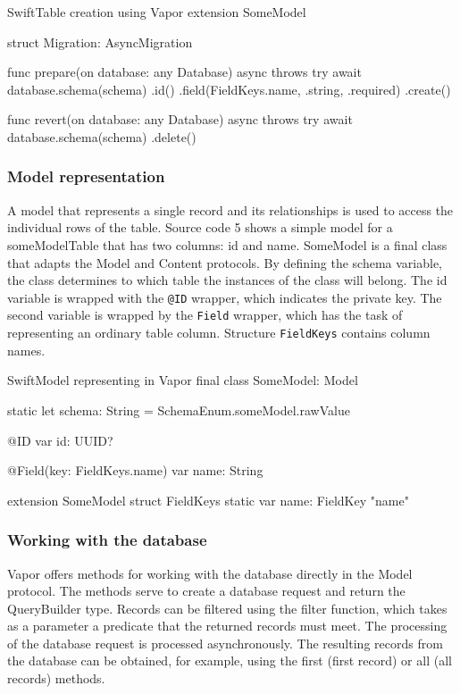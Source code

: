 \documentclass[
  biblatex = false,
  language=english,
  figures=false,
  sourcecodes,
  glossaries,
  index
]{kidiplom}
\begin{document}
\begin{kicode}{Swift}{}{Table creation using Vapor}
extension SomeModel {
    struct Migration: AsyncMigration {
        
        func prepare(on database: any Database) async throws {
            try await database.schema(schema)
                .id()
                .field(FieldKeys.name, .string, .required)
                .create()
        }
        
        func revert(on database: any Database) async throws {
            try await database.schema(schema)
                .delete()
        }
    }
}
\end{kicode}

\subsubsection{Model representation}
A model \cite{bib6} that represents a single record and its relationships is used to access the individual rows of the table. Source code 5 shows a simple model for a someModelTable that has two columns: id and name. SomeModel is a final class that adapts the Model and Content protocols. By defining the schema variable, the class determines to which table the instances of the class will belong. The id variable is wrapped with the \texttt{@ID} wrapper, which indicates the private key. The second variable is wrapped by the \texttt{Field} wrapper, which has the task of representing an ordinary table column. Structure \texttt{FieldKeys} contains column names.

\begin{kicode}{Swift}{}{Model representing in Vapor}
final class SomeModel: Model {
    
    static let schema: String = SchemaEnum.someModel.rawValue
    
    @ID
    var id: UUID?
    
    @Field(key: FieldKeys.name)
    var name: String
}
extension SomeModel {
    struct FieldKeys {
        static var name: FieldKey {"name"}
    }
}
\end{kicode}

\subsubsection{Working with the database}
Vapor offers methods for working with the database directly in the Model protocol. The methods serve to create a database request and return the QueryBuilder type. Records can be filtered using the filter function, which takes as a parameter a predicate that the returned records must meet. The processing of the database request is processed asynchronously. The resulting records from the database can be obtained, for example, using the first (first record) or all (all records) methods.
\end{document}
